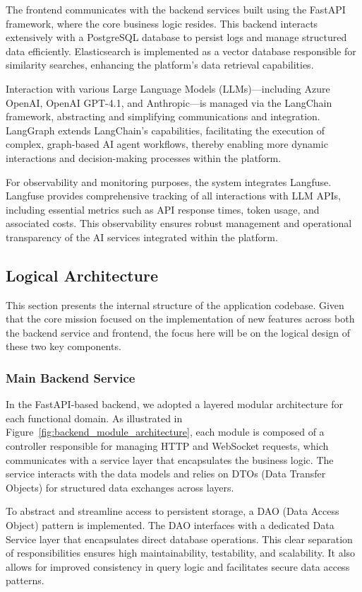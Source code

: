 The frontend communicates with the backend services built using the FastAPI framework, where the core business logic resides. This backend interacts extensively with a PostgreSQL database to persist logs and manage structured data efficiently. Elasticsearch is implemented as a vector database responsible for similarity searches, enhancing the platform’s data retrieval capabilities.\mynewline

Interaction with various Large Language Models (LLMs)—including Azure OpenAI, OpenAI GPT-4.1, and Anthropic—is managed via the LangChain framework, abstracting and simplifying communications and integration. LangGraph extends LangChain’s capabilities, facilitating the execution of complex, graph-based AI agent workflows, thereby enabling more dynamic interactions and decision-making processes within the platform.\mynewline

For observability and monitoring purposes, the system integrates Langfuse. Langfuse provides comprehensive tracking of all interactions with LLM APIs, including essential metrics such as API response times, token usage, and associated costs. This observability ensures robust management and operational transparency of the AI services integrated within the platform.

\subsection{Logical Architecture}
This section presents the internal structure of the application codebase. Given that the core mission focused on the implementation of new features across both the backend service and frontend, the focus here will be on the logical design of these two key components.

\subsubsection{Main Backend Service}
In the FastAPI-based backend, we adopted a layered modular architecture for each functional domain. As illustrated in Figure~\ref{fig:backend_module_architecture}, each module is composed of a controller responsible for managing HTTP and WebSocket requests, which communicates with a service layer that encapsulates the business logic. The service interacts with the data models and relies on DTOs (Data Transfer Objects) for structured data exchanges across layers.\mynewline

To abstract and streamline access to persistent storage, a DAO (Data Access Object) pattern is implemented. The DAO interfaces with a dedicated Data Service layer that encapsulates direct database operations. This clear separation of responsibilities ensures high maintainability, testability, and scalability. It also allows for improved consistency in query logic and facilitates secure data access patterns.\mynewline

